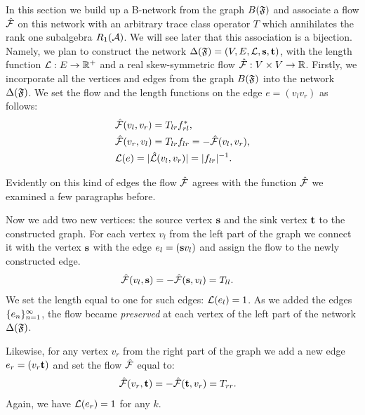 \documentclass[12pt,oneside,a4paper]{amsart}
\begin{document}
      In this section we build up a B-network from the graph $B(\fsys)$ and associate a flow $\flow$ on this network with 
        an arbitrary trace class operator $T$ which annihilates the rank one subalgebra $R_1(\cal{A})$.
      We will see later that this association is a bijection.
      Namely, we plan to construct the network $\net(\fsys) = (V, E, \len, \source, \sink)$,
        with the length function $\len: E \to \mathbb{R}^{+}$ and a real skew-symmetric flow $\flow: V \times V \to \mathbb{R}$.
      Firstly, we incorporate all the vertices and edges from the graph $B(\fsys)$ into the network $\net(\fsys)$.
      We set the flow and the length functions on the edge $e = (v_l v_r)$ as follows:
      \begin{align*}
        &\flow(v_l, v_r) = T_{lr} f^*_{rl},\\
        &\flow(v_r, v_l) = T_{lr} f_{lr} = -\flow(v_l, v_r),\\
        &\len(e) = \lvert \wt(v_l, v_r) \rvert =  \lvert f_{lr}\rvert^{-1}.
      \end{align*}
      \begin{remark}
        Evidently on this kind of edges the flow $\flow$ agrees with the function $\flowsgn$
          we examined a few paragraphs before.
      \end{remark}

      Now we add two new vertices: the source vertex $\source$ and the sink vertex $\sink$ to the constructed graph.
      For each vertex $v_l$ from the left part of the graph we connect it with the vertex $\source$ with the edge $e_l = (\source v_l)$
        and assign the flow to the newly constructed edge.
      \begin{align*}
        &\flow(v_l, \source) = -\flow(\source, v_l) = T_{ll}.
      \end{align*}
      We set the length equal to one for such edges: $\len(e_l) = 1$.
      As we added the edges $\seq{e}$, the flow became \emph{preserved} at each vertex of the left part of the network $\net(\fsys)$.

      Likewise, for any vertex $v_r$ from the right part of the graph we add a new edge $e_r=(v_r \sink)$
        and set the flow $\flow$ equal to:
      \begin{align*}
        &\flow(v_r, \sink) = -\flow(\sink, v_r) =  T_{rr}.
      \end{align*}
      Again, we have $\len(e_r) = 1$ for any $k$.
\end{document}
